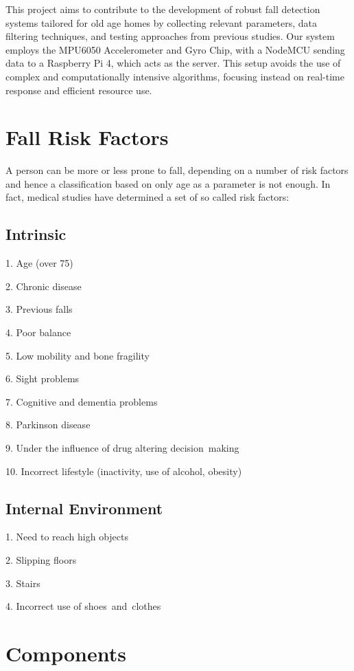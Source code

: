 \documentclass[final,5p,times,twocolumn,authoryear]{elsarticle}
\begin{document}
This project aims to contribute to the development of robust fall detection systems tailored for old age homes by collecting relevant parameters, data filtering techniques, and testing approaches from previous studies. Our system employs the MPU6050 Accelerometer and Gyro Chip, with a NodeMCU sending data to a Raspberry Pi 4, which acts as the server. This setup avoids the use of complex and computationally intensive algorithms, focusing instead on real-time response and efficient resource use. 

\section{Fall Risk Factors}
A person can be more or less prone to fall, depending on a number of risk factors and hence a classiﬁcation based on only age as a parameter is not enough. In fact, medical studies have determined a set of so called risk factors:

\subsection{Intrinsic}

1. Age (over 75)

2. Chronic disease

3. Previous falls

4. Poor balance

5. Low mobility and bone fragility

6. Sight problems

7. Cognitive and dementia problems

8. Parkinson disease

9. Under the influence of drug altering decision making

10. Incorrect lifestyle (inactivity, use of alcohol, obesity)

\subsection{Internal Environment}

1. Need to reach high objects

2. Slipping ﬂoors

3. Stairs

4. Incorrect use of shoes and clothes



\section{Components}
\end{document}
